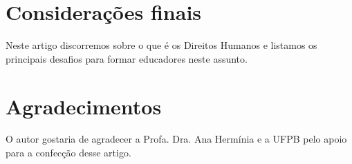 \documentclass[
	article,			%
	11pt,				%
	oneside,			%
	a4paper,			%
	english,			%
	brazil,				%
	sumario=tradicional
]{abntex2}
\begin{document}
\section{Considerações finais}

Neste artigo discorremos sobre o que é os Direitos Humanos e listamos os
principais desafios para formar educadores neste assunto.




\postextual





\section*{Agradecimentos}
O autor gostaria de agradecer a Profa. Dra. Ana Hermínia e a UFPB pelo apoio
para a confecção desse artigo.
\end{document}
